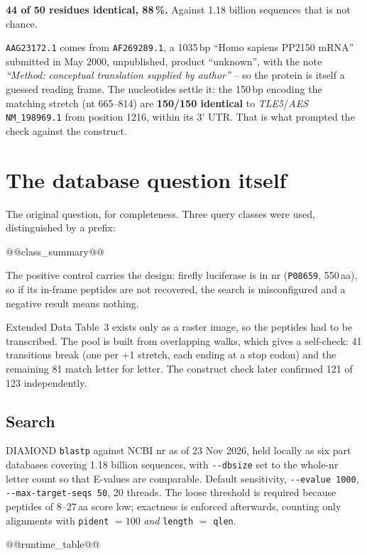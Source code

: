 \documentclass[11pt,a4paper]{article}
\begin{document}
\textbf{44 of 50 residues identical, 88\,\%.} Against 1.18 billion sequences
that is not chance.

\texttt{AAG23172.1} comes from \texttt{AF269289.1}, a 1035\,bp ``Homo sapiens
PP2150 mRNA'' submitted in May 2000, unpublished, product ``unknown'', with
the note \emph{``Method: conceptual translation supplied by author''} -- so
the protein is itself a guessed reading frame. The nucleotides settle it: the
150\,bp encoding the matching stretch (nt 665--814) are \textbf{150/150
identical} to \emph{TLE5}/\emph{AES} \texttt{NM\_198969.1} from position 1216,
within its 3' UTR. That is what prompted the check against the construct.

\section{The database question itself}

The original question, for completeness. Three query classes were used,
distinguished by a prefix:

@@class_summary@@

The positive control carries the design: firefly luciferase is in nr
(\texttt{P08659}, 550\,aa), so if its in-frame peptides are not recovered, the
search is misconfigured and a negative result means nothing.

Extended Data Table~3 exists only as a raster image, so the peptides had to be
transcribed. The pool is built from overlapping walks, which gives a
self-check: 41 transitions break (one per +1 stretch, each ending at a stop
codon) and the remaining 81 match letter for letter. The construct check later
confirmed 121 of 123 independently.

\subsection{Search}

DIAMOND \texttt{blastp} against NCBI nr as of 23 Nov 2026, held locally as six
part databases covering 1.18 billion sequences, with \texttt{-{}-dbsize} set
to the whole-nr letter count so that E-values are comparable. Default
sensitivity, \texttt{-{}-evalue 1000}, \texttt{-{}-max-target-seqs 50}, 20
threads. The loose threshold is required because peptides of 8--27\,aa score
low; exactness is enforced afterwards, counting only alignments with
\texttt{pident} $= 100$ \emph{and} \texttt{length} $=$ \texttt{qlen}.

@@runtime_table@@
\end{document}
